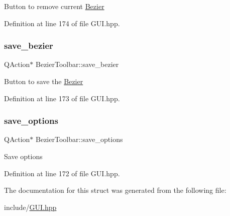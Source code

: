 Button to remove current \mbox{\hyperlink{classBezier}{Bezier}} 

Definition at line 174 of file G\+U\+I.\+hpp.

\mbox{\label{structBezierToolbar_a2848e3a1e3d0eb3dfe63959c12538782}} 
\subsubsection{\texorpdfstring{save\+\_\+bezier}{save\_bezier}}
{\footnotesize\ttfamily Q\+Action$\ast$ Bezier\+Toolbar\+::save\+\_\+bezier}

Button to save the \mbox{\hyperlink{classBezier}{Bezier}} 

Definition at line 173 of file G\+U\+I.\+hpp.

\mbox{\label{structBezierToolbar_a9d3e4ffe8c28b246dafd257110e28994}} 
\subsubsection{\texorpdfstring{save\+\_\+options}{save\_options}}
{\footnotesize\ttfamily Q\+Action$\ast$ Bezier\+Toolbar\+::save\+\_\+options}

Save options 

Definition at line 172 of file G\+U\+I.\+hpp.



The documentation for this struct was generated from the following file\+:\begin{DoxyCompactItemize}
\item 
include/\mbox{\hyperlink{GUI_8hpp}{G\+U\+I.\+hpp}}\end{DoxyCompactItemize}
